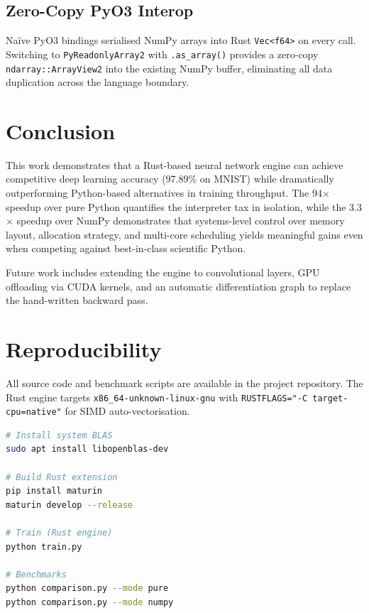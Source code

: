 \documentclass[11pt]{article}
\begin{document}
\subsection{Zero-Copy PyO3 Interop}

Na\"{i}ve PyO3 bindings serialised NumPy arrays into Rust \texttt{Vec<f64>} on every call. Switching to \texttt{PyReadonlyArray2} with \texttt{.as\_array()} provides a zero-copy \texttt{ndarray::ArrayView2} into the existing NumPy buffer, eliminating all data duplication across the language boundary.

\section{Conclusion}

This work demonstrates that a Rust-based neural network engine can achieve competitive deep learning accuracy (97.89\% on MNIST) while dramatically outperforming Python-based alternatives in training throughput. The 94$\times$ speedup over pure Python quantifies the interpreter tax in isolation, while the 3.3$\times$ speedup over NumPy demonstrates that systems-level control over memory layout, allocation strategy, and multi-core scheduling yields meaningful gains even when competing against best-in-class scientific Python.

Future work includes extending the engine to convolutional layers, GPU offloading via CUDA kernels, and an automatic differentiation graph to replace the hand-written backward pass.

\section*{Reproducibility}

All source code and benchmark scripts are available in the project repository. The Rust engine targets \texttt{x86\_64-unknown-linux-gnu} with \texttt{RUSTFLAGS="-C target-cpu=native"} for SIMD auto-vectorisation.

\begin{lstlisting}[language=bash, caption={Build and run instructions.}]
# Install system BLAS
sudo apt install libopenblas-dev

# Build Rust extension
pip install maturin
maturin develop --release

# Train (Rust engine)
python train.py

# Benchmarks
python comparison.py --mode pure
python comparison.py --mode numpy
\end{lstlisting}
\end{document}
